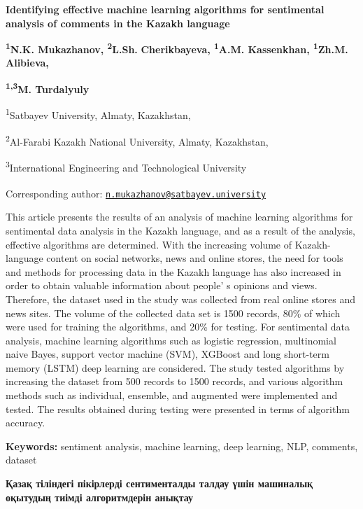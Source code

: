 
{\bfseries Identifying effective machine learning algorithms for
sentimental analysis of comments in the Kazakh language}

{\bfseries \textsuperscript{1}N.K. Mukazhanov\textsuperscript{\envelope },
\textsuperscript{2}L.Sh.} {\bfseries Cherikbayeva, \textsuperscript{1}A.M.
Kassenkhan, \textsuperscript{1}Zh.M. Alibieva,}

{\bfseries \textsuperscript{1,3}M. Turdalyuly}

\textsuperscript{1}Satbayev University, Almaty, Kazakhstan,

\textsuperscript{2}Al-Farabi Kazakh National University, Almaty,
Kazakhstan,

\textsuperscript{3}International Engineering and Technological
University

\raggedright {\bfseries \textsuperscript{\envelope }}Corresponding author: \href{mailto:n.mukazhanov@satbayev.university}{\nolinkurl{n.mukazhanov@satbayev.university}}

This article presents the results of an analysis of machine learning
algorithms for sentimental data analysis in the Kazakh language, and as
a result of the analysis, effective algorithms are determined. With the
increasing volume of Kazakh-language content on social networks, news
and online stores, the need for tools and methods for processing data in
the Kazakh language has also increased in order to obtain valuable
information about people' s opinions and views.
Therefore, the dataset used in the study was collected from real online
stores and news sites. The volume of the collected data set is 1500
records, 80\% of which were used for training the algorithms, and 20\%
for testing. For sentimental data analysis, machine learning algorithms
such as logistic regression, multinomial naive Bayes, support vector
machine (SVM), XGBoost and long short-term memory (LSTM) deep learning
are considered. The study tested algorithms by increasing the dataset
from 500 records to 1500 records, and various algorithm methods such as
individual, ensemble, and augmented were implemented and tested. The
results obtained during testing were presented in terms of algorithm
accuracy.

{\bfseries Keywords:} sentiment analysis, machine learning, deep learning,
NLP, comments, dataset

{\bfseries Қазақ тіліндегі пікірлерді сентименталды талдау үшін машиналық
оқытудың тиімді алгоритмдерін анықтау}

